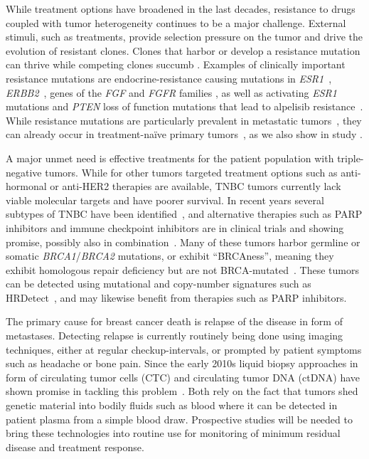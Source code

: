 \documentclass[11pt]{book}
\begin{document}
While treatment options have broadened in the last decades, resistance to drugs coupled with tumor heterogeneity continues to be a major challenge. External stimuli, such as treatments, provide selection pressure on the tumor and drive the evolution of resistant clones. Clones that harbor or develop a resistance mutation can thrive while competing clones succumb \cite{Gerlinger:2019}. Examples of clinically important resistance mutations are endocrine-resistance causing mutations in \textit{ESR1}~\cite{Toy:2013}, \textit{ERBB2}~\cite{Bose:2013, Nayar:2018}, genes of the \textit{FGF} and \textit{FGFR} families \cite{Mao:2020}, as well as activating \textit{ESR1} mutations and \textit{PTEN} loss of function mutations that lead to alpelisib resistance~\cite{Razavi:2020}. While resistance mutations are particularly prevalent in metastatic tumors~\cite{Robinson:2013, Nayar:2018}, they can already occur in treatment-naïve primary tumors~\cite{Dahlgren:2020}, as we also show in study \IV.

A major unmet need is effective treatments for the patient population with triple-negative tumors. While for other tumors targeted treatment options such as anti-hormonal or anti-HER2 therapies are available, TNBC tumors currently lack viable molecular targets and have poorer survival. In recent years several subtypes of TNBC have been identified~\cite{Lehmann:2011}, and alternative therapies such as PARP inhibitors and immune checkpoint inhibitors \cite{Vagia:2020} are in clinical trials and showing promise, possibly also in combination~\cite{Goncalves:2020}. Many of these tumors harbor germline or somatic \textit{BRCA1}/\textit{BRCA2} mutations, or exhibit ``BRCAness'', meaning they exhibit homologous repair deficiency but are not BRCA-muta\-ted~\cite{LordAshworth:2016}. These tumors can be detected using mutational and copy-number signatures such as HRDetect~\cite{Davies:2017}, and may likewise benefit from therapies such as PARP inhibitors.

The primary cause for breast cancer death is relapse of the disease in form of metastases. Detecting relapse is currently routinely being done using imaging techniques, either at regular checkup-intervals, or prompted by patient symptoms such as headache or bone pain. Since the early 2010s liquid biopsy approaches in form of circulating tumor cells (CTC) and circulating tumor DNA (ctDNA) have shown promise in tackling this problem~\cite{Olsson:2015, Garcia-Murillas:2015}. Both rely on the fact that tumors shed genetic material into bodily fluids such as blood where it can be detected in patient plasma from a simple blood draw. Prospective studies will be needed to bring these technologies into routine use for monitoring of minimum residual disease and treatment response.
\end{document}
